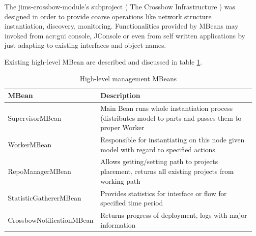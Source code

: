 \documentclass[11pt,openany]{book}
\begin{document}
        The jims-crossbow-module's subproject ( The Crossbow Infrastructure ) was designed in order to provide
        coarse operations like network structure instantiation, discovery, monitoring. 
        Functionalities provided by MBeans may invoked from \gls{acr:gui} console, JConsole or even from self written 
        applications by just adapting to existing interfaces and object names. 

        Existing high-level MBean are described and discussed in table \ref{tab:impl:hl-mbean}.

        \begin{table}[H]
          \centering

          \begin{tabularx}{\textwidth}{|l|X|}
            \hline
            MBean                     & Description                        \\
            \hline \hline
            SupervisorMBean           & Main Bean runs whole instantiation
                                        process (distributes model to
                                        parts and passes them to proper
                                        Worker                             \\
            \hline
            WorkerMBean               & Responsible for instantiating on
                                        this node given model with regard
                                        to specified  actions              \\
            \hline
            RepoManagerMBean          & Allows getting/setting path to
                                        projects placement, returns all
                                        existing projects from working
                                        path                               \\
            \hline
            StatisticGathererMBean    & Provides statistics for interface
                                        or flow for specified time period  \\
            \hline
            CrossbowNotificationMBean & Returns progress of deployment,
                                        logs with major information        \\
            \hline
          \end{tabularx}

          \caption{High-level management MBeans}
          \label{tab:impl:hl-mbean}
        \end{table}
\end{document}
